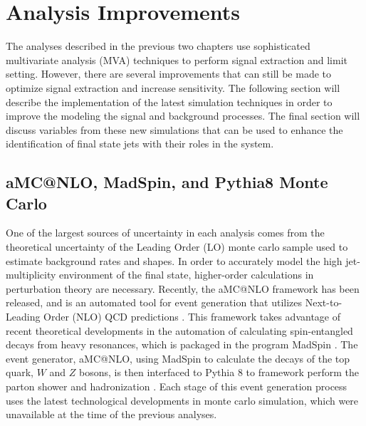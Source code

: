 \chapter{Analysis Improvements}
\label{analysis_improvements_overview}

\par The analyses described in the previous two chapters use
sophisticated multivariate analysis (MVA) techniques to perform signal
extraction and limit setting.  However, there are several improvements
that can still be made to optimize signal extraction and increase
sensitivity.  The following section will describe the implementation
of the latest simulation techniques in order to improve the modeling
the signal and background processes.  The final section will discuss
variables from these new simulations that can be used to enhance the
identification of final state jets with their roles in the \ttbar
system.   


%



\section{aMC@NLO, MadSpin, and Pythia8 Monte Carlo}
\label{aMCatNLO_pythia8_overview}

\par One of the largest sources of uncertainty in each analysis comes
from the theoretical uncertainty of the Leading Order (LO) monte carlo
sample  used to estimate background rates and shapes.  In order to
accurately model the high jet-multiplicity environment of the \ttH
final state, higher-order calculations in perturbation theory are
necessary.  Recently, the aMC@NLO framework has been released, and is
an automated tool for event generation that utilizes Next-to-Leading
Order (NLO) QCD predictions \cite{Alwall:2014hca}.  This framework
takes advantage of recent theoretical developments in the automation
of calculating spin-entangled decays from heavy resonances, which is
packaged in the program MadSpin \cite{Artoisenet:2012st}.  The event
generator, aMC@NLO, using MadSpin to calculate the decays of the top
quark, $W$ and $Z$ bosons, is then interfaced to Pythia 8 to framework
perform the parton shower and hadronization \cite{Sjostrand:2007gs}.
Each stage of this event generation process uses the latest
technological developments in monte carlo simulation, which were
unavailable at the time of the previous analyses.  

